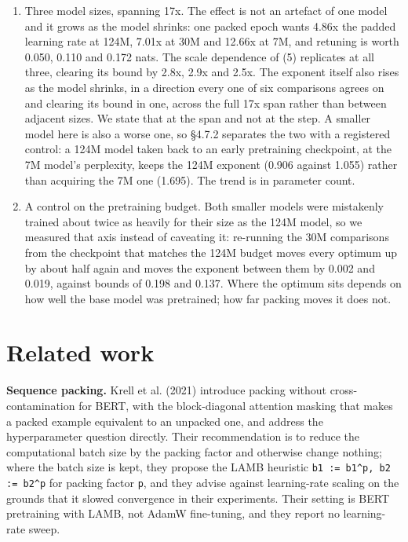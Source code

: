\documentclass[11pt]{article}
\begin{document}
\begin{enumerate}
\item Three model sizes, spanning 17x. The effect is not an artefact of one model and it grows as the model shrinks: one packed epoch wants 4.86x the padded learning rate at 124M, 7.01x at 30M and 12.66x at 7M, and retuning is worth 0.050, 0.110 and 0.172 nats. The scale dependence of (5) replicates at all three, clearing its bound by 2.8x, 2.9x and 2.5x. The exponent itself also rises as the model shrinks, in a direction every one of six comparisons agrees on and clearing its bound in one, across the full 17x span rather than between adjacent sizes. We state that at the span and not at the step. A smaller model here is also a worse one, so \S{}4.7.2 separates the two with a registered control: a 124M model taken back to an early pretraining checkpoint, at the 7M model's perplexity, keeps the 124M exponent (0.906 against 1.055) rather than acquiring the 7M one (1.695). The trend is in parameter count.
\item A control on the pretraining budget. Both smaller models were mistakenly trained about twice as heavily for their size as the 124M model, so we measured that axis instead of caveating it: re-running the 30M comparisons from the checkpoint that matches the 124M budget moves every optimum up by about half again and moves the exponent between them by 0.002 and 0.019, against bounds of 0.198 and 0.137. Where the optimum sits depends on how well the base model was pretrained; how far packing moves it does not.
\end{enumerate}

\section{Related work}

\textbf{Sequence packing.} Krell et al. (2021) introduce packing without cross-contamination for BERT, with the block-diagonal attention masking that makes a packed example equivalent to an unpacked one, and address the hyperparameter question directly. Their recommendation is to reduce the computational batch size by the packing factor and otherwise change nothing; where the batch size is kept, they propose the LAMB heuristic \texttt{b1 := b1\textasciicircum{}p, b2 := b2\textasciicircum{}p} for packing factor \texttt{p}, and they advise against learning-rate scaling on the grounds that it slowed convergence in their experiments. Their setting is BERT pretraining with LAMB, not AdamW fine-tuning, and they report no learning-rate sweep.
\end{document}
